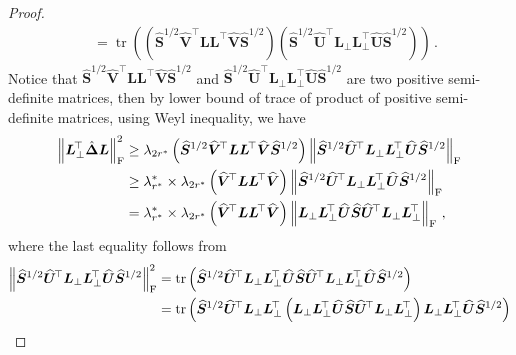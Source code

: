 \begin{proof}
\begin{align*}
    & = \operatorname{tr}\left(\left(\widehat{\bm S}^{1/2}\widehat{\bm V}^{\!\top}\bm L \bm L^{\!\top} \widehat{\bm V}\widehat{\bm S}^{1/2}\right)\left(\widehat{\bm S}^{1/2}\widehat{\bm U}^{\!\top}\bm L_\perp \bm L_\perp^{\!\top} \widehat{\bm U}\widehat{\bm S}^{1/2}\right)\right)\,.
\end{align*}
Notice that $\widehat{\bm S}^{1/2}\widehat{\bm V}^{\!\top}\bm L \bm L^{\!\top} \widehat{\bm V}\widehat{\bm S}^{1/2}$ and $\widehat{\bm S}^{1/2}\widehat{\bm U}^{\!\top}\bm L_\perp \bm L_\perp^{\!\top} \widehat{\bm U}\widehat{\bm S}^{1/2}$ are two positive semi-definite matrices, then by lower bound of trace of product of positive semi-definite matrices, using Weyl inequality, we have
\begin{align*}
    \left\|\bm L_\perp^{\!\top}\hat{\bm \Delta}\bm L\right\|^2_{\rm F} & \geq \lambda_{2r^*}\left(\widehat{\bm S}^{1/2}\widehat{\bm V}^{\!\top}\bm L \bm L^{\!\top} \widehat{\bm V}\widehat{\bm S}^{1/2}\right)\left\|\widehat{\bm S}^{1/2}\widehat{\bm U}^{\!\top}\bm L_\perp \bm L_\perp^{\!\top} \widehat{\bm U}\widehat{\bm S}^{1/2}\right\|_{\rm F}\\
    & \geq \lambda^*_{r^*}\times\lambda_{2r^*}\left(\widehat{\bm V}^{\!\top}\bm L \bm L^{\!\top} \widehat{\bm V}\right)\left\|\widehat{\bm S}^{1/2}\widehat{\bm U}^{\!\top}\bm L_\perp \bm L_\perp^{\!\top} \widehat{\bm U}\widehat{\bm S}^{1/2}\right\|_{\rm F}\\
    & = \lambda^*_{r^*}\times\lambda_{2r^*}\left(\widehat{\bm V}^{\!\top}\bm L \bm L^{\!\top} \widehat{\bm V}\right)\left\|\bm L_\perp \bm L_\perp^{\!\top} \widehat{\bm U}\widehat{\bm S}\widehat{\bm U}^{\!\top}\bm L_\perp \bm L_\perp^{\!\top}\right\|_{\rm F}\,,
\end{align*}
where the last equality follows from
\begin{align*}
    \left\|\widehat{\bm S}^{1/2}\widehat{\bm U}^{\!\top}\bm L_\perp \bm L_\perp^{\!\top} \widehat{\bm U}\widehat{\bm S}^{1/2}\right\|^2_{\rm F} & = \operatorname{tr}\left(\widehat{\bm S}^{1/2}\widehat{\bm U}^{\!\top}\bm L_\perp \bm L_\perp^{\!\top} \widehat{\bm U}\widehat{\bm S}\widehat{\bm U}^{\!\top}\bm L_\perp \bm L_\perp^{\!\top} \widehat{\bm U}\widehat{\bm S}^{1/2}\right)\\
    & = \operatorname{tr}\left(\widehat{\bm S}^{1/2}\widehat{\bm U}^{\!\top}\bm L_\perp \bm L_\perp^{\!\top}\left(\bm L_\perp \bm L_\perp^{\!\top} \widehat{\bm U}\widehat{\bm S}\widehat{\bm U}^{\!\top}\bm L_\perp \bm L_\perp^{\!\top}\right) \bm L_\perp \bm L_\perp^{\!\top}\widehat{\bm U}\widehat{\bm S}^{1/2}\right)\\

\end{align*}
\end{proof}
